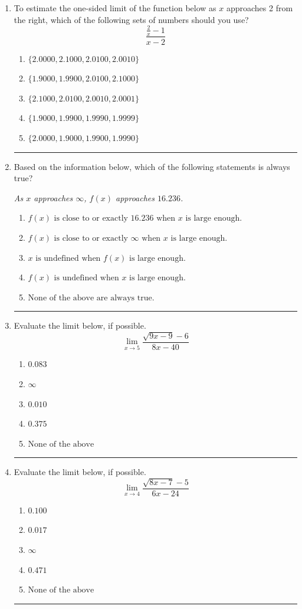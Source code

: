 \documentclass[14pt]{extbook}
\newcommand{\litem}[1]{\item#1\hspace*{-1cm}\rule{\textwidth}{0.4pt}}
\begin{document}
\begin{enumerate}
{\begin{enumerate}[label=\Alph*.]
\end{enumerate} }
\litem{
To estimate the one-sided limit of the function below as $x$ approaches 2 from the right, which of the following sets of numbers should you use?\[ \frac{\frac{2}{x} - 1}{x - 2} \]\begin{enumerate}[label=\Alph*.]
\item \( \{ 2.0000, 2.1000, 2.0100, 2.0010 \} \)
\item \( \{ 1.9000, 1.9900, 2.0100, 2.1000 \} \)
\item \( \{ 2.1000, 2.0100, 2.0010, 2.0001 \} \)
\item \( \{ 1.9000, 1.9900, 1.9990, 1.9999 \} \)
\item \( \{ 2.0000, 1.9000, 1.9900, 1.9990 \} \)

\end{enumerate} }
\litem{
Based on the information below, which of the following statements is always true?
\begin{center}
    \textit{ As $x$ approaches $\infty$, $f(x)$ approaches $16.236$. }
\end{center}
\begin{enumerate}[label=\Alph*.]
\item \( f(x) \text{ is close to or exactly } 16.236 \text{ when } x \text{ is large enough}. \)
\item \( f(x) \text{ is close to or exactly } \infty \text{ when } x \text{ is large enough}. \)
\item \( x \text{ is undefined when } f(x) \text{ is large enough}. \)
\item \( f(x) \text{ is undefined when } x \text{ is large enough}. \)
\item \( \text{None of the above are always true.} \)

\end{enumerate} }
\litem{
Evaluate the limit below, if possible.\[ \lim_{x \rightarrow 5} \frac{\sqrt{9x - 9} - 6}{8x - 40} \]\begin{enumerate}[label=\Alph*.]
\item \( 0.083 \)
\item \( \infty \)
\item \( 0.010 \)
\item \( 0.375 \)
\item \( \text{None of the above} \)

\end{enumerate} }
\litem{
Evaluate the limit below, if possible.\[ \lim_{x \rightarrow 4} \frac{\sqrt{8x - 7} - 5}{6x - 24} \]\begin{enumerate}[label=\Alph*.]
\item \( 0.100 \)
\item \( 0.017 \)
\item \( \infty \)
\item \( 0.471 \)
\item \( \text{None of the above} \)

\end{enumerate} }
\end{enumerate}
\end{document}
